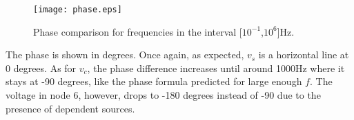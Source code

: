 \begin{figure}[!htp] \centering
\texttt{[image: phase.eps]}
\caption{Phase comparison for frequencies in the interval [$10^{-1}$,$10^6$]Hz.}
\label{fig6}
\end{figure}
\FloatBarrier
The phase is shown in degrees. Once again, as expected, $v_s$ is a horizontal line at 0 degrees. As for $v_c$, the phase difference increases until around 1000Hz where it stays at -90 degrees, like the phase formula predicted for large enough $f$. The voltage in node 6, however, drops to -180 degrees instead of -90 due to the presence of dependent sources.


